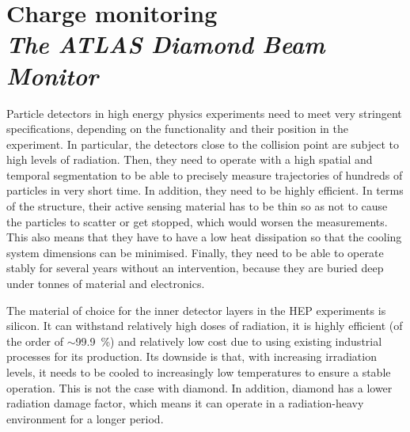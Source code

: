 \documentclass[twoside,12pt]{packages/mytustyle}  %
\newcommand\Chapter[2]{\chapter
  [#1\hfil\hbox{}\protect\linebreak{\itshape#2}]%
  {#1\\[2ex]\Large\itshape#2}%
}
\begin{document}
\baselineskip=15pt

\tableofcontents

\Chapter{Charge monitoring}{The ATLAS Diamond Beam Monitor}

%
%
%
%
%
%
%
%
%
%
%


Particle detectors in high energy physics experiments need to meet very stringent specifications, depending on the functionality and their position in the experiment. In particular, the detectors close to the collision point are subject to high levels of radiation. Then, they need to operate with a high spatial and temporal segmentation to be able to precisely measure trajectories of hundreds of particles in very short time. In addition, they need to be highly efficient. In terms of the structure, their active sensing material has to be thin so as not to cause the particles to scatter or get stopped, which would worsen the measurements. This also means that they have to have a low heat dissipation so that the cooling system dimensions can be minimised. Finally, they need to be able to operate stably for several years without an intervention, because they are buried deep under tonnes of material and electronics. 

The material of choice for the inner detector layers in the HEP experiments is silicon. It can withstand relatively high doses of radiation, it is highly efficient (of the order of $\sim$99.9~\%) and relatively low cost due to using existing industrial processes for its production. Its downside is that, with increasing irradiation levels, it needs to be cooled to increasingly low temperatures to ensure a stable operation. This is not the case with diamond. In addition, diamond has a lower radiation damage factor, which means it can operate in a radiation-heavy environment for a longer period.
\end{document}

